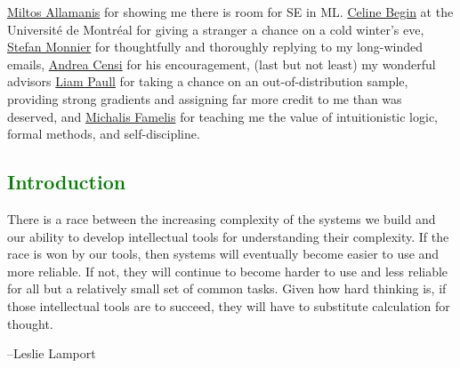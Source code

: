 \documentclass[12pt,initial,twoside,maitrise]{dms}
\newcommand{\welldone}[1]{\textcolor{green}{#1}}
\numberwithin{equation}{section}
\numberwithin{table}{chapter}
\numberwithin{figure}{chapter}
\begin{document}
\href{https://miltos.allamanis.com/}{Miltos Allamanis} for showing me there is room for SE in ML. \href{https://diro.umontreal.ca/accueil/}{Celine Begin} at the Universit\'e de Montr\'eal for giving a stranger a chance on a cold winter's eve, \href{https://www.iro.umontreal.ca/~monnier/}{Stefan Monnier} for thoughtfully and thoroughly replying to my long-winded emails, \href{https://censi.science/}{Andrea Censi} for his encouragement, (last but not least) my wonderful advisors \href{http://liampaull.ca/}{Liam Paull} for taking a chance on an out-of-distribution sample, providing strong gradients and assigning far more credit to me than was deserved, and \href{https://michalis.famelis.info/}{Michalis Famelis} for teaching me the value of intuitionistic logic, formal methods, and self-discipline.


\anglais
\cleardoublepage
{}  %
\tableofcontents
\cleardoublepage
{}  %
\listoftables
\cleardoublepage
{}
\listoffigures

\NoChapterPageNumber
\cleardoublepage
{}

\welldone{\chapter{Introduction}\label{ch:introduction}}

\setlength{\epigraphwidth}{0.85\textwidth}
\epigraph{There is a race between the increasing complexity of the systems we build and our ability to develop intellectual tools for understanding their complexity. If the race is won by our tools, then systems will eventually become easier to use and more reliable. If not, they will continue to become harder to use and less reliable for all but a relatively small set of common tasks. Given how hard thinking is, if those intellectual tools are to succeed, they will have to substitute calculation for thought.}{\begin{flushright}--Leslie Lamport\end{flushright}}
\end{document}

